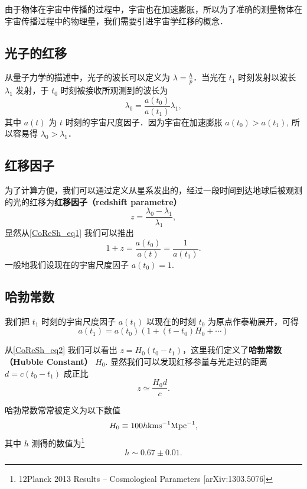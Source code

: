 
\begin{issues}
\issueMissDepend
\end{issues}

由于物体在宇宙中传播的过程中，宇宙也在加速膨胀，所以为了准确的测量物体在宇宙传播过程中的物理量，我们需要引进宇宙学红移的概念．

\subsection{光子的红移}
从量子力学的描述中，光子的波长可以定义为 $\lambda=\frac{h}{p}$．当光在 $t_1$ 时刻发射以波长 $\lambda_1$ 发射，于 $t_0$ 时刻被接收所观测到的波长为
\begin{equation}\label{CoReSh_eq1}
\lambda_0=\frac{a(t_0)}{a(t_1)}\lambda_1,
\end{equation}
其中 $a(t)$ 为 $t$ 时刻的宇宙尺度因子．因为宇宙在加速膨胀 $a(t_0)>a(t_1)$, 所以容易得 $\lambda_0>\lambda_1$．

\subsection{红移因子}
为了计算方便，我们可以通过定义从星系发出的，经过一段时间到达地球后被观测的光的红移为\textbf{红移因子（redshift parametre）}
\begin{equation}
z=\frac{\lambda_0-\lambda_1}{\lambda_1},
\end{equation}
显然从\autoref{CoReSh_eq1} 我们可以推出
\begin{equation}
1+z=\frac{a(t_0)}{a(t)}=\frac{1}{a(t_1)}. \label{CoReSh_eq2}
\end{equation}
一般地我们设现在的宇宙尺度因子 $a(t_0)=1$.

\subsection{哈勃常数}
我们把 $t_1$ 时刻的宇宙尺度因子 $a(t_1)$ 以现在的时刻 $t_0$ 为原点作泰勒展开，可得
\begin{equation}
a(t_1)=a(t_0)(1+(t-t_0)H_0+\cdots)
\end{equation}

从\autoref{CoReSh_eq2} 我们可以看出 $z=H_0(t_0-t_1)$，这里我们定义了\textbf{哈勃常数（Hubble Constant）} $H_0$. 显然我们可以发现红移参量与光走过的距离 $d=c(t_0-t_1)$ 成正比
\begin{equation}
z\simeq\frac{H_0d}{c}.
\end{equation}

哈勃常数常常被定义为以下数值
\begin{equation}
H_0 \equiv100 h {\rm kms}^{-1}{\rm Mpc}^{-1},
\end{equation}
其中 $h$ 测得的数值为\footnote{12Planck 2013 Results – Cosmological Parameters [arXiv:1303.5076]}
\begin{equation}
h\sim 0.67 \pm 0.01.
\end{equation}